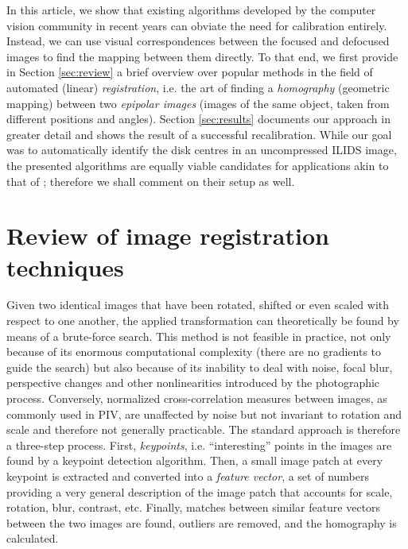 \documentclass[floatfix,aip,rsi,reprint,graphicx]{revtex4-1}
\begin{document}
In this article, we show that existing algorithms developed by the computer
vision community in recent years can obviate the need for calibration entirely.
Instead, we can use visual correspondences between the focused and defocused
images to find the mapping between them directly. To that end, we first provide
in Section \ref{sec:review} a brief overview over popular methods in the field of automated (linear)
\emph{registration}, i.e. the art of finding a \emph{homography} (geometric
mapping) between two \emph{epipolar images} (images of the same object, taken
from different positions and angles). Section \ref{sec:results} documents 
our approach in greater detail and shows the result of a successful
recalibration. While our goal was to automatically identify the disk centres in
an uncompressed ILIDS image, the presented algorithms are equally viable candidates for
applications akin to that of \citet{Hardalupas10}; therefore we shall comment on their
setup as well.

\section{Review of image registration techniques \label{sec:review}}
Given two identical images that have been rotated, shifted or even scaled with
respect to one another, the applied transformation can theoretically be found by
means of a brute-force search. This method is not feasible in practice, not only
because of its enormous computational complexity (there are no gradients to
guide the search) but also because of its inability to deal with noise, focal
blur, perspective changes and other nonlinearities introduced by the
photographic process. Conversely, normalized cross-correlation measures between
images, as commonly used in PIV, are unaffected by noise but not invariant to
rotation and scale and therefore not generally practicable. The standard
approach is therefore a three-step process. First, \emph{keypoints}, i.e.
``interesting'' points in the images are found by a keypoint detection algorithm.
Then, a small image patch at every keypoint is extracted and converted into a
\emph{feature vector}, a set of numbers providing a very general description of
the image patch that accounts for scale, rotation, blur, contrast, etc. Finally,
matches between similar feature vectors between the two images are found,
outliers are removed, and the homography is calculated.
\end{document}
